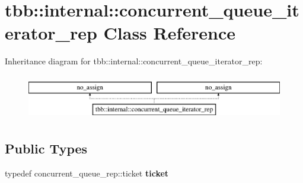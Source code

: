 \hypertarget{classtbb_1_1internal_1_1concurrent__queue__iterator__rep}{}\section{tbb\+:\+:internal\+:\+:concurrent\+\_\+queue\+\_\+iterator\+\_\+rep Class Reference}
\label{classtbb_1_1internal_1_1concurrent__queue__iterator__rep}
Inheritance diagram for tbb\+:\+:internal\+:\+:concurrent\+\_\+queue\+\_\+iterator\+\_\+rep\+:\begin{figure}[H]
\begin{center}
\leavevmode
\includegraphics[height=2.000000cm]{classtbb_1_1internal_1_1concurrent__queue__iterator__rep}
\end{center}
\end{figure}
\subsection*{Public Types}
\begin{DoxyCompactItemize}
\item 
\hypertarget{classtbb_1_1internal_1_1concurrent__queue__iterator__rep_a2fcde54ed925c3d544118300590289b8}{}typedef concurrent\+\_\+queue\+\_\+rep\+::ticket {\bfseries ticket}\label{classtbb_1_1internal_1_1concurrent__queue__iterator__rep_a2fcde54ed925c3d544118300590289b8}

\end{DoxyCompactItemize}
